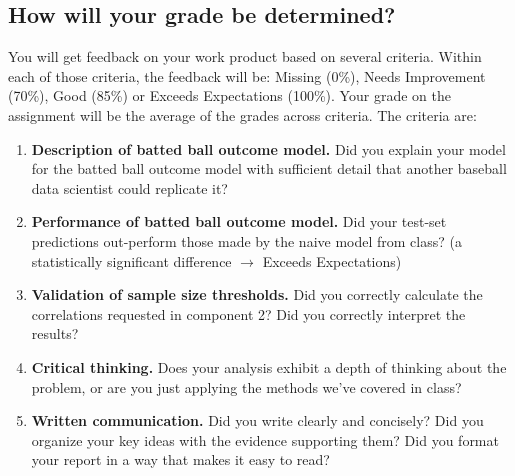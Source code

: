 \documentclass{article}
\begin{document}
    \subsection*{\sc How will your grade be determined?}

      You will get feedback on your work product based on several criteria. Within each of those criteria, the feedback will be: Missing (0\%), Needs Improvement (70\%), Good (85\%) or Exceeds Expectations (100\%). Your grade on the assignment will be the average of the grades across criteria. The criteria are:
      \begin{enumerate}
        \item {\bf Description of batted ball outcome model.} Did you explain your model for the batted ball outcome model with sufficient detail that another baseball data scientist could replicate it?
        \item {\bf Performance of batted ball outcome model.} Did your test-set predictions out-perform those made by the naive model from class? (a statistically significant difference $\rightarrow$ Exceeds Expectations)
        \item {\bf Validation of sample size thresholds.} Did you correctly calculate the correlations requested in component 2? Did you correctly interpret the results?
        \item {\bf Critical thinking.} Does your analysis exhibit a depth of thinking about the problem, or are you just applying the methods we've covered in class?
        \item {\bf Written communication.} Did you write clearly and concisely? Did you organize your key ideas with the evidence supporting them? Did you format your report in a way that makes it easy to read?
      \end{enumerate}
\end{document}
